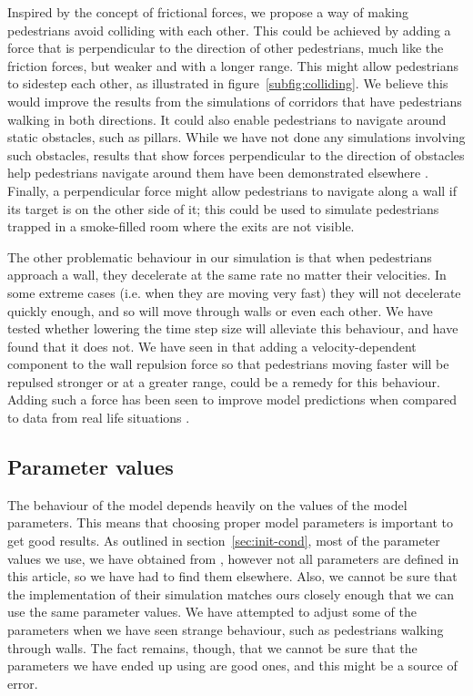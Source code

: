 Inspired by the concept of frictional forces, we propose a way of making 
pedestrians avoid colliding with each other. This could be achieved by adding 
a force that is perpendicular to the direction of other pedestrians, much like 
the friction forces, but weaker and with a longer range.  This might allow 
pedestrians to sidestep each other, as illustrated in 
figure~\ref{subfig:colliding}. We believe this would improve the results from 
the simulations of corridors that have pedestrians walking in both directions.  
It could also enable pedestrians to navigate around static obstacles, such as 
pillars. While we have not done any simulations involving such obstacles, 
results that show forces perpendicular to the direction of obstacles help 
pedestrians navigate around them have been demonstrated elsewhere \cite{tang}. 
Finally, a perpendicular force might allow pedestrians to navigate along a 
wall if its target is on the other side of it; this could be used to simulate 
pedestrians trapped in a smoke-filled room where the exits are not visible.

The other problematic behaviour in our simulation is that when pedestrians 
approach a wall, they decelerate at the same rate no matter their velocities.  
In some extreme cases (i.e. when they are moving very fast) they will not 
decelerate quickly enough, and so will move through walls or even each other.  
We have tested whether lowering the time step size will alleviate this 
behaviour, and have found that it does not. We have seen in \cite{ABconstant} 
that adding a  velocity-dependent component to the wall repulsion force so 
that pedestrians moving faster will be repulsed stronger or at a greater 
range, could be a remedy for this behaviour. Adding such a force has been seen 
to improve model predictions when compared to data from real life situations 
\cite{ABconstant}.

\subsection{Parameter values}
The behaviour of the model depends heavily on the values of the model 
parameters. This means that choosing proper model parameters is important to 
get good results. As outlined in section~\ref{sec:init-cond}, most of the 
parameter values we use, we have obtained from \cite{self-org}, however not 
all parameters are defined in this article, so we have had to find them 
elsewhere. Also, we cannot be sure that the implementation of their simulation 
matches ours closely enough that we can use the same parameter values.  We 
have attempted to adjust some of the parameters when we have seen strange 
behaviour, such as pedestrians walking through walls. The fact remains, 
though, that we cannot be sure that the parameters we have ended up using are 
good ones, and this might be a source of error.

